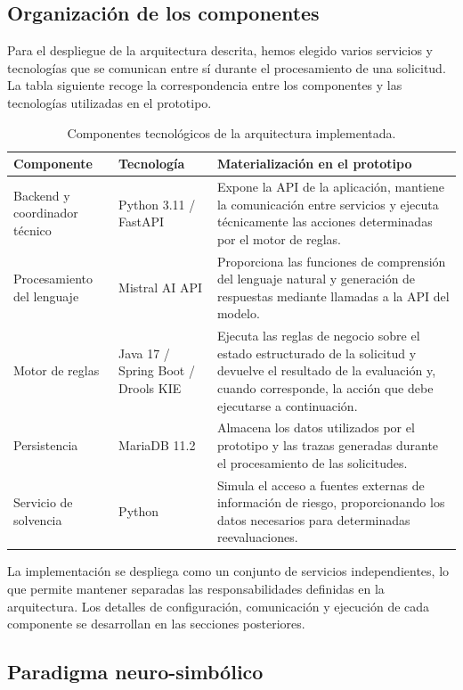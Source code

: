 \documentclass[12pt,a4paper]{report}
\begin{document}
\subsection{Organización de los componentes}

Para el despliegue de la arquitectura descrita, hemos elegido varios servicios y tecnologías que se comunican entre sí durante el procesamiento de una solicitud. La tabla siguiente recoge la correspondencia entre los componentes y las tecnologías utilizadas en el prototipo.

\begin{table}[H]
\centering
\begin{tabular}{|p{3.2cm}|p{3.8cm}|p{6.5cm}|}
\hline
\textbf{Componente} & \textbf{Tecnología} & \textbf{Materialización en el prototipo} \\
\hline
Backend y coordinador técnico & Python 3.11 / FastAPI & Expone la API de la aplicación, mantiene la comunicación entre servicios y ejecuta técnicamente las acciones determinadas por el motor de reglas. \\
\hline
Procesamiento del lenguaje & Mistral AI API & Proporciona las funciones de comprensión del lenguaje natural y generación de respuestas mediante llamadas a la API del modelo. \\
\hline
Motor de reglas & Java 17 / Spring Boot / Drools KIE & Ejecuta las reglas de negocio sobre el estado estructurado de la solicitud y devuelve el resultado de la evaluación y, cuando corresponde, la acción que debe ejecutarse a continuación. \\
\hline
Persistencia & MariaDB 11.2 & Almacena los datos utilizados por el prototipo y las trazas generadas durante el procesamiento de las solicitudes. \\
\hline
Servicio de solvencia & Python & Simula el acceso a fuentes externas de información de riesgo, proporcionando los datos necesarios para determinadas reevaluaciones. \\
\hline
\end{tabular}
\caption{Componentes tecnológicos de la arquitectura implementada.}
\end{table}

La implementación se despliega como un conjunto de servicios independientes, lo que permite mantener separadas las responsabilidades definidas en la arquitectura. Los detalles de configuración, comunicación y ejecución de cada componente se desarrollan en las secciones posteriores.

\subsection{Paradigma neuro-simbólico}
\end{document}

